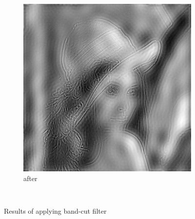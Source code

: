 \documentclass[12pt]{article}
\begin{document}
\begin{figure}[H]
\begin{subfigure}[t]{\subfiguresize}
        \includegraphics[width=\textwidth]{img/lena_bandcut.png}
        \caption{after}
    \end{subfigure}\\[1em]
    \caption{Results of applying band-cut filter}
\end{figure}  
\end{document}
